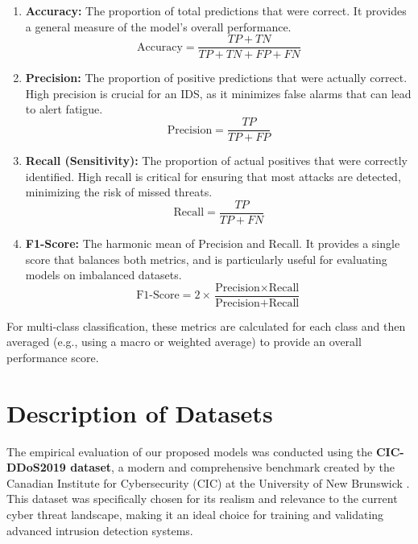 \documentclass{report}
\begin{document}
\begin{enumerate}
    \item \textbf{Accuracy:} The proportion of total predictions that were correct. It provides a general measure of the model's overall performance.
    \begin{equation}
        \text{Accuracy} = \frac{TP + TN}{TP + TN + FP + FN}
    \end{equation}

    \item \textbf{Precision:} The proportion of positive predictions that were actually correct. High precision is crucial for an IDS, as it minimizes false alarms that can lead to alert fatigue.
    \begin{equation}
        \text{Precision} = \frac{TP}{TP + FP}
    \end{equation}

    \item \textbf{Recall (Sensitivity):} The proportion of actual positives that were correctly identified. High recall is critical for ensuring that most attacks are detected, minimizing the risk of missed threats.
    \begin{equation}
        \text{Recall} = \frac{TP}{TP + FN}
    \end{equation}

    \item \textbf{F1-Score:} The harmonic mean of Precision and Recall. It provides a single score that balances both metrics, and is particularly useful for evaluating models on imbalanced datasets.
    \begin{equation}
        \text{F1-Score} = 2 \times \frac{\text{Precision} \times \text{Recall}}{\text{Precision} + \text{Recall}}
    \end{equation}
\end{enumerate}

For multi-class classification, these metrics are calculated for each class and then averaged (e.g., using a macro or weighted average) to provide an overall performance score.

\section{Description of Datasets}
The empirical evaluation of our proposed models was conducted using the \textbf{CIC-DDoS2019 dataset}, a modern and comprehensive benchmark created by the Canadian Institute for Cybersecurity (CIC) at the University of New Brunswick \cite{cicddos2019}. This dataset was specifically chosen for its realism and relevance to the current cyber threat landscape, making it an ideal choice for training and validating advanced intrusion detection systems.
\end{document}
